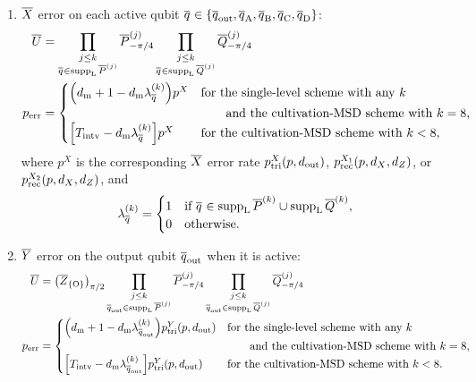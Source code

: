 \documentclass[
 prx,
 reprint,
 superscriptaddress,
 longbibliography,
 dvipsnames
]{revtex4-2}
\begin{document}
\begin{widetext}
\begin{enumerate}
    \item $\overline{X}$ error on each active qubit $\overline{q}_{\text{}} \in \qty{\overline{q}_{\text{out}}, \overline{q}_{\text{A}}, \overline{q}_{\text{B}}, \overline{q}_{\text{C}}, \overline{q}_{\text{D}}}$:
    \begin{align*}
        \overline{U} &= \prod_{\substack{j \leq k \\ \overline{q}_{\text{}} \in \operatorname{supp}_{\mathrm{L}}\overline{P}^{(j)}}} \overline{P}^{(j)}_{-\pi/4} \prod_{\substack{j \leq k \\ \overline{q}_{\text{}} \in \operatorname{supp}_{\mathrm{L}}\overline{Q}^{(j)}}} \overline{Q}^{(j)}_{-\pi/4} \\
        p_{\mathrm{err}} &= \begin{cases}
            \qty(d_{\mathrm{m}} + 1 - d_{\mathrm{m}}\lambda_{\overline{q}_{\text{}}}^{(k)})p^X & \text{for the single-level scheme with any $k$} \\
            & \qquad \text{and the cultivation-MSD scheme with $k = 8$}, \\
            \qty[T_{\mathrm{intv}} - d_{\mathrm{m}}\lambda_{\overline{q}_{\text{}}}^{(k)}]p^X & \text{for the cultivation-MSD scheme with $k < 8$},
        \end{cases}
    \end{align*}
    where $p^X$ is the corresponding $\overline{X}$ error rate $p_{\mathrm{tri}}^{X}(p, d_{\mathrm{out}})$, $p_{\mathrm{rec}}^{X_1}(p, {d_X}, {d_Z})$, or $p_{\mathrm{rec}}^{X_2}(p, {d_X}, {d_Z})$, and
    \begin{align*}
        \lambda_{\overline{q}_{\text{}}}^{(k)} = \begin{cases}
            1 & \text{if } \overline{q}_{\text{}} \in \operatorname{supp}_{\mathrm{L}} \overline{P}^{(k)} \cup \operatorname{supp}_{\mathrm{L}} \overline{Q}^{(k)}, \\
            0 & \text{otherwise}.
        \end{cases}
    \end{align*}

    \item $\overline{Y}$ error on the output qubit $\overline{q}_{\text{out}}$ when it is active:
    \begin{align*}
        \overline{U} &= \qty(\overline{Z}_\qty{\text{O}})_{\pi/2} \prod_{\substack{j \leq k \\ \overline{q}_{\text{out}} \in \operatorname{supp}_{\mathrm{L}}\overline{P}^{(j)}}} \overline{P}^{(j)}_{-\pi/4} \prod_{\substack{j \leq k \\ \overline{q}_{\text{out}} \in \operatorname{supp}_{\mathrm{L}}\overline{Q}^{(j)}}} \overline{Q}^{(j)}_{-\pi/4} \\
        p_{\mathrm{err}} &= \begin{cases}
            \qty(d_{\mathrm{m}} + 1 - d_{\mathrm{m}}\lambda_{\overline{q}_{\text{out}}}^{(k)})p_{\mathrm{tri}}^{Y}(p, d_{\mathrm{out}}) & \text{for the single-level scheme with any $k$} \\
            & \qquad \text{and the cultivation-MSD scheme with $k = 8$}, \\
            \qty[T_{\mathrm{intv}} - d_{\mathrm{m}}\lambda_{\overline{q}_{\text{out}}}^{(k)}]p_{\mathrm{tri}}^{Y}(p, d_{\mathrm{out}}) & \text{for the cultivation-MSD scheme with $k < 8$}.
        \end{cases}
    \end{align*}


\end{enumerate}
\end{widetext}
\end{document}
